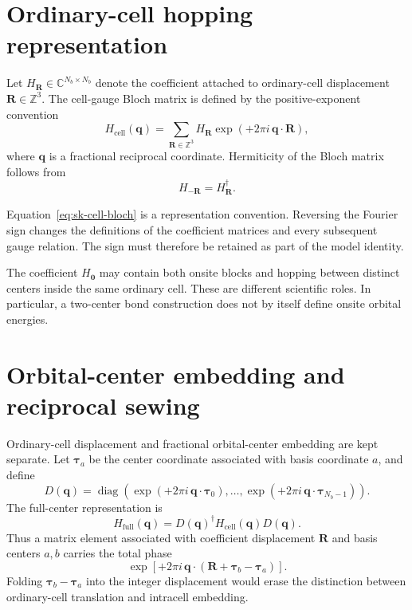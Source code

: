 \section{Ordinary-cell hopping representation}

Let $H_{\mathbf R}\in\mathbb C^{N_b\times N_b}$ denote the coefficient attached
to ordinary-cell displacement $\mathbf R\in\mathbb Z^3$. The cell-gauge Bloch
matrix is defined by the positive-exponent convention
\begin{equation}
  H_{\mathrm{cell}}(\mathbf q)
  =
  \sum_{\mathbf R\in\mathbb Z^3}
  H_{\mathbf R}
  \exp\!\left(+2\pi i\,\mathbf q\cdot\mathbf R\right),
  \label{eq:sk-cell-bloch}
\end{equation}
where $\mathbf q$ is a fractional reciprocal coordinate. Hermiticity of the
Bloch matrix follows from
\begin{equation}
  H_{-\mathbf R}=H_{\mathbf R}^{\dagger}.
  \label{eq:sk-hermitian-support}
\end{equation}

Equation~\eqref{eq:sk-cell-bloch} is a representation convention. Reversing the
Fourier sign changes the definitions of the coefficient matrices and every
subsequent gauge relation. The sign must therefore be retained as part of the
model identity.

The coefficient $H_{\mathbf0}$ may contain both onsite blocks and hopping
between distinct centers inside the same ordinary cell. These are different
scientific roles. In particular, a two-center bond construction does not by
itself define onsite orbital energies.

\section{Orbital-center embedding and reciprocal sewing}

Ordinary-cell displacement and fractional orbital-center embedding are kept
separate. Let $\boldsymbol\tau_a$ be the center coordinate associated with
basis coordinate $a$, and define
\begin{equation}
  D(\mathbf q)
  =
  \operatorname{diag}\!
  \left(
    \exp(+2\pi i\,\mathbf q\cdot\boldsymbol\tau_0),
    \ldots,
    \exp(+2\pi i\,\mathbf q\cdot\boldsymbol\tau_{N_b-1})
  \right).
  \label{eq:sk-center-gauge}
\end{equation}
The full-center representation is
\begin{equation}
  H_{\mathrm{full}}(\mathbf q)
  =
  D(\mathbf q)^{\dagger}
  H_{\mathrm{cell}}(\mathbf q)
  D(\mathbf q).
  \label{eq:sk-full-center}
\end{equation}
Thus a matrix element associated with coefficient displacement $\mathbf R$ and
basis centers $a,b$ carries the total phase
\begin{equation}
  \exp\!\left[
    +2\pi i\,\mathbf q\cdot
    (\mathbf R+\boldsymbol\tau_b-\boldsymbol\tau_a)
  \right].
\end{equation}
Folding $\boldsymbol\tau_b-\boldsymbol\tau_a$ into the integer displacement
would erase the distinction between ordinary-cell translation and intracell
embedding.

